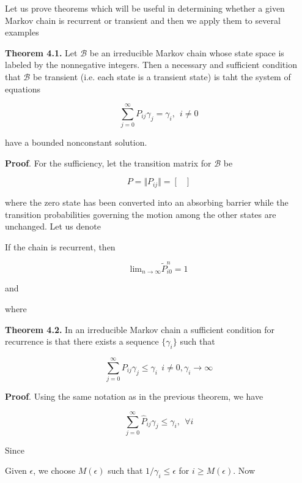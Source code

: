 \documentclass[12pt]{article}
\theoremstyle{nonumberbreak}
\begin{document}
Let us prove theorems which will be useful in determining whether a
given Markov chain is recurrent or transient and then we apply them to
several examples

\begin{theorem}
\textbf{Theorem 4.1.} Let $\mathcal{B}$ be an irreducible Markov chain whose state space is labeled by the nonnegative integers. Then a necessary and sufficient condition that $\mathcal{B}$ be transient (i.e. each state is a transient state) is taht the system of equations

$$
\sum_{j=0}^\infty P_{ij} \gamma_j = \gamma_i, \ \ i\neq0
$$

have a bounded nonconstant solution.

\end{theorem}

\textbf{Proof}. For the sufficiency, let the transition matrix for $\mathcal{B}$ be

$$
P = \Vert P_{ij} \Vert = \begin{bmatrix}
\end{bmatrix}
$$

where the zero state has been converted into an absorbing barrier while the transition probabilities governing the motion among the other states are unchanged. Let us denote 




If the chain is recurrent, then 

$$
\mathrm{lim}_{n\to\infty} \tilde{P}_{i0}^n = 1
$$

and 


where



\begin{theorem}
\textbf{Theorem 4.2.} In an irreducible Markov chain a sufficient condition for recurrence is that there exists a sequence $\{ \gamma_i \}$ such that

$$
\sum_{j=0}^\infty P_{ij} \gamma_j \le \gamma_i \ \ i \neq 0, \gamma_i \to \infty
$$

\end{theorem}

\textbf{Proof}. Using the same notation as in the previous theorem, we have

$$
\sum_{j=0}^\infty \hat{P}_{ij} \gamma_j \le \gamma_i, \ \ \forall i
$$

Since 



Given $\epsilon$, we choose $M(\epsilon)$ such that $1/\gamma_i \le \epsilon$ for $i \ge M(\epsilon)$. Now
\end{document}
